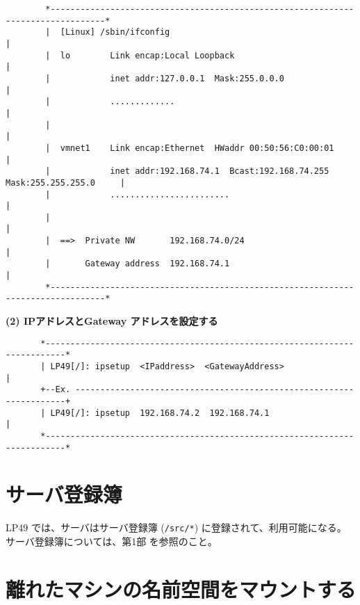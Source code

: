 \begin{verbatim}  
        *---------------------------------------------------------------------------------*
        |  [Linux] /sbin/ifconfig                                                         |
        |  lo        Link encap:Local Loopback                                            |
        |            inet addr:127.0.0.1  Mask:255.0.0.0                                  |
        |            .............                                                        |
        |                                                                                 |
        |  vmnet1    Link encap:Ethernet  HWaddr 00:50:56:C0:00:01                        |
        |            inet addr:192.168.74.1  Bcast:192.168.74.255  Mask:255.255.255.0     |
        |            ........................                                             |
        |                                                                                 |
        |  ==>  Private NW       192.168.74.0/24                                          |
        |       Gateway address  192.168.74.1                                             |
        *---------------------------------------------------------------------------------* 
\end{verbatim}  

{\bf (2) IPアドレスとGateway アドレスを設定する}

\begin{verbatim}  
       *--------------------------------------------------------------------------*  
       | LP49[/]: ipsetup  <IPaddress>  <GatewayAddress>                          |         
       +--Ex. --------------------------------------------------------------------+ 
       | LP49[/]: ipsetup  192.168.74.2  192.168.74.1                             | 
       *--------------------------------------------------------------------------*  
\end{verbatim}  


    
\chapter{サーバ登録簿}

      LP49 では、サーバはサーバ登録簿 (\verb|/src/*|) に登録されて、利用可能になる。
      サーバ登録簿については、第1部      を参照のこと。

    
\chapter{離れたマシンの名前空間をマウントする}


